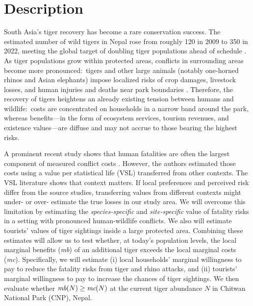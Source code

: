 \documentclass[12pt,letterpaper]{article}
\begin{document}
\section*{Description}

South Asia's tiger recovery has become a rare conservation success. The estimated number of wild tigers in Nepal rose from roughly 120 in 2009 to 350 in 2022, meeting the global target of doubling tiger populations ahead of schedule \citep{wwf2022nepal355}. As tiger populations grow within protected areas, conflicts in surrounding areas become more pronounced:\ tigers and other large animals (notably one-horned rhinos and Asian elephants) impose localized risks of crop damages, livestock losses, and human injuries and deaths near park boundaries \citep{lamichhane2018Spatio,acharya2016hwcnepal}. Therefore, the recovery of tigers heightens an already existing tension between humans and wildlife:\ costs are concentrated on households in a narrow band around the park, whereas benefits---in the form of ecosystem services, tourism revenues, and existence values---are diffuse and may not accrue to those bearing the highest risks.
	
	A prominent recent study shows that human fatalities are often the largest component of measured conflict costs \citep{gulati2021casualties}. However, the authors estimated those costs using a value per statistical life (VSL) transferred from other contexts. The VSL literature shows that context matters. If local preferences and perceived risk differ from the source studies, transferring values from different contexts might under- or over- estimate the true losses in our study area. We will overcome this limitation by estimating the \emph{species-specific} and \emph{site-specific} value of fatality risks in a setting with pronounced human-wildlife conflicts. We also will estimate tourists' values of tiger sightings inside a large protected area. Combining these estimates will allow us to test whether, at today's population levels, the local marginal benefits (\emph{mb}) of an additional tiger exceeds the local marginal costs (\emph{mc}). Specifically, we will estimate (i) local households' marginal willingness to pay to reduce the fatality risks from tiger and rhino attacks, and (ii) tourists' marginal willingness to pay to increase the chances of tiger sightings. We then evaluate whether $\emph{mb}(N)\ge \emph{mc}(N)$ at the current tiger abundance $N$ in Chitwan National Park (CNP), Nepal.
	
\end{document}
